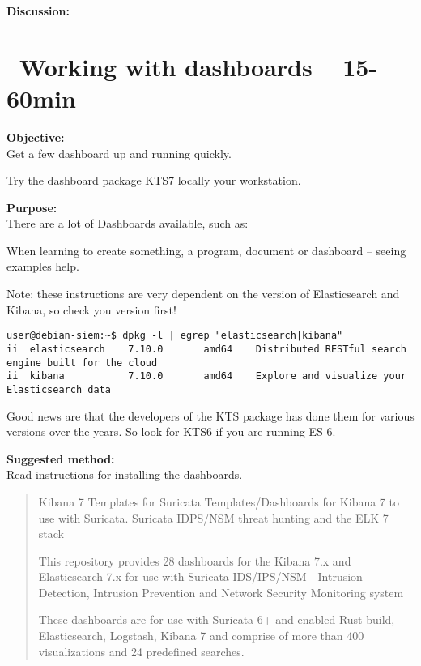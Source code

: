 \documentclass[a4paper,11pt,notitlepage]{report}
\begin{document}
{\bf Discussion:}\\



\chapter{\faExclamationTriangle\ Working with dashboards -- 15-60min}
\label{ex:kibana-kts}

{\bf Objective:}\\
Get a few dashboard up and running quickly.

Try the dashboard package KTS7 locally your workstation.


{\bf Purpose:}\\
There are a lot of Dashboards available, such as:\\

When learning to create something, a program, document or dashboard -- seeing examples help.

Note: these instructions are very dependent on the version of Elasticsearch and Kibana, so check you version first!
\begin{verbatim}
user@debian-siem:~$ dpkg -l | egrep "elasticsearch|kibana"
ii  elasticsearch    7.10.0       amd64    Distributed RESTful search engine built for the cloud
ii  kibana           7.10.0       amd64    Explore and visualize your Elasticsearch data
\end{verbatim}

Good news are that the developers of the KTS package has done them for various versions over the years. So look for KTS6 if you are running ES 6.

{\bf Suggested method:}\\
Read instructions for installing the dashboards.


\begin{quote}
Kibana 7 Templates for Suricata
Templates/Dashboards for Kibana 7 to use with Suricata. Suricata IDPS/NSM threat hunting and the ELK 7 stack

This repository provides 28 dashboards for the Kibana 7.x and Elasticsearch 7.x for use with Suricata IDS/IPS/NSM - Intrusion Detection, Intrusion Prevention and Network Security Monitoring system

These dashboards are for use with Suricata 6+ and enabled Rust build, Elasticsearch, Logstash, Kibana 7 and comprise of more than 400 visualizations and 24 predefined searches.
\end{quote}
\end{document}
